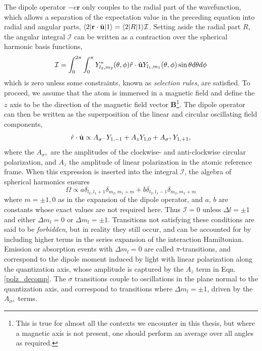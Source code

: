 	The dipole operator $-e\textbf{r}$ only couples to the radial part of the wavefunction, which allows a separation of the expectation value in the preceding equation into radial and angular parts, $\langle2|\textbf{r}\cdot\hat{\mathbf{u}}|1\rangle = \langle2|R|1\rangle\mathcal{I}$.
	Setting aside the radial part $R$, the angular integral $\mathcal{I}$ can be written as a contraction over the spherical harmonic basis functions, 
	\begin{equation}
		\mathcal{I}=\int_{0}^{2\pi}\int_{0}^{\pi} Y^{*}_{l_2,m_2}(\theta,\phi)\hat{r}\cdot\hat{\mathbf{u}}Y_{l_1,m_1}(\theta,\phi)\sin\theta d\theta d\phi
	\end{equation} 
	which is zero unless some constraints, known as \emph{selection rules}, are satisfied.
	To proceed, we assume that the atom is immersed in a magnetic field and define the $z$ axis to be the direction of the magnetic field vector $\textbf{B}$\footnote{This is true for almost all the contexts we encounter in this thesis, but where a magnetic axis is not present, one should perform an average over all angles as required.}.
	The dipole operator can then be written as the superposition of the linear and circular oscillating field components,  
	\begin{equation}
		\hat{r}\cdot\hat{\mathbf{u}}\propto A_{\sigma^-}Y_{1,-1} + A_z Y_{1,0} + A_{\sigma^+}Y_{1,+1},
		\label{polz_decomp}
	\end{equation}
	where the $A_{\sigma^\pm}$ are the amplitudes of the clockwise- and anti-clockwise circular polarization, and $A_z$ the amplitude of linear polarization in the atomic reference frame.
	When this expression is inserted into the integral $\mathcal{I}$, the algebra of spherical harmonics ensures \cite{FootAtomic}
	\begin{equation}
		\Omega\propto a\delta_{l_2,l_1+1}\delta_{m_2,m_1+m} + b\delta_{l_2,l_1-1}\delta_{m_2,m_1+m}
	\end{equation}
	where $m=\pm1,0$ as in the expansion of the dipole operator, and $a$, $b$ are constants whose exact values are not required here.
	Thus $\mathcal{I}=0$ unless $\Delta l=\pm1$ and either $\Delta m_l=0$ or $\Delta m_l=\pm1$.
	Transitions not satisfying these conditions are said to be \emph{forbidden}, but in reality they still occur, and can be accounted for by including higher terms in the series expansion of the interaction Hamiltonian.
	Emission or absorption events with $\Delta m_l=0$ are called $\pi$-transitions, and correspond to the dipole moment induced by light with linear polarization along the quantization axis, whose amplitude is captured by the $A_z$ term in Eqn.
	\ref{polz_decomp}.
	The $\sigma$ transitions couple to oscillations in the plane normal to the quantization axis, and correspond to transitions where $\Delta m_l=\pm 1$, driven by the $A_{\sigma^\pm}$ terms.
	
